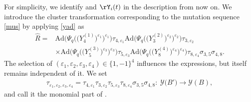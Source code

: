 For simplicity, we identify  and $\rY_i(t)$ in the
description from now on. We introduce the cluster transformation
corresponding to the mutation sequence \eqref{mus} by applying
\eqref{yad} as
\begin{align}
\widehat{R} ={}&
\mathrm{Ad}\bigl(\Psi_q\bigl(\bigl(Y^{(1)}_4\bigr)^{\varepsilon_1}\bigr)^{\varepsilon_1}\bigr)\tau_{4,\varepsilon_1}
\mathrm{Ad}\bigl(\Psi_q\bigl(\bigl(Y^{(2)}_3\bigr)^{\varepsilon_2}\bigr)^{\varepsilon_2}\bigr)\tau_{3,\varepsilon_2}\nonumber
\\
 & \times
\mathrm{Ad}\bigl(\Psi_q\bigl(\bigl(Y^{(3)}_5\bigr)^{\varepsilon_3}\bigr)^{\varepsilon_3}\bigr)\tau_{5,\varepsilon_3}
\mathrm{Ad}\bigl(\Psi_q\bigl(\bigl(Y^{(4)}_8\bigr)^{\varepsilon_4}\bigr)^{\varepsilon_4}\bigr)\tau_{8,\varepsilon_4}
\sigma_{3,5}\sigma_{4,8}.\label{rhat}
\end{align}
The selection of $(\varepsilon_1, \varepsilon_2, \varepsilon_3, \varepsilon_4) \in \{1,-1\}^4$
influences the expressions, but  itself remains independent of it.
We set
\begin{align}\label{taue}
\tau_{\varepsilon_1, \varepsilon_2, \varepsilon_3, \varepsilon_4} =
\tau_{4,\varepsilon_1}
\tau_{3,\varepsilon_2}
\tau_{5,\varepsilon_3}
\tau_{8,\varepsilon_4} \sigma_{3,5}\sigma_{4,8}\colon\
\mathcal{Y}\bigl(B'\bigr) \rightarrow \mathcal{Y}(B),
 \end{align}
 and call it the monomial part of .


